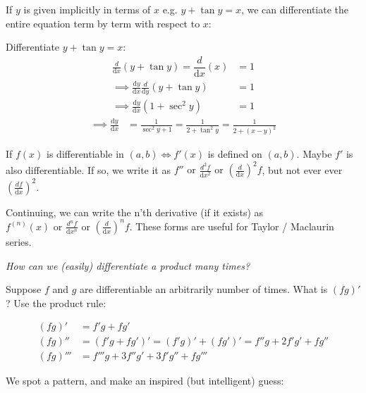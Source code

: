 \documentclass[10pt]{scrartcl}
\begin{document}

If $y$ is given implicitly in terms of $x$ e.g. $y + \tan y = x$, we can differentiate the entire equation term by term with respect to $x$:\\

\begin{example}
Differentiate $y + \tan y = x$:
\begin{align*}\nonumber
\frac{d}{\mathrm{d}x}(y + \tan y) = \dfrac{d}{\mathrm{d}x}(x) &= 1
\\ \nonumber 
\implies \frac{\mathrm{d}y}{\mathrm{d}x}\frac{d}{\mathrm{d}y}(y + \tan y) &= 1
\\ \nonumber
\implies \frac{\mathrm{d}y}{\mathrm{d}x}(1 + \sec^2y) &= 1
\end{align*}
\begin{align*}
\implies \frac{\mathrm{d}y}{\mathrm{d}x} &= \frac{1}{\sec^2y + 1} = \frac{1}{2 + \tan^2y} = \frac{1}{2 + (x-y)^2}
\end{align*}
\end{example}




If $f(x)$ is differentiable in $(a,b) \iff f'(x)$ is defined on $(a,b)$. Maybe $f'$ is also differentiable. If so, we write it as 
 $f''\text{ or }\frac{d^2f}{\mathrm{d}x^2}\text{ or }\left(\frac{d}{\mathrm{d}x}\right)^2f$, 
 but not ever ever $\left(\frac{df}{\mathrm{d}x}\right)^2$.
 
 Continuing, we can write the n'th derivative (if it exists) as 
 $f^{(n)}(x)\text{ or  }\frac{d^nf}{\mathrm{d}x^n}\text{ or }\left(\frac{d}{\mathrm{d}x}\right)^n f$. These forms are useful for Taylor / Maclaurin series.


\textit{How can we (easily) differentiate a product many times?} 

Suppose $f$ and $g$ are differentiable an arbitrarily number of times. What is $(fg)'$? Use the product rule:

\[
\begin{aligned}
  (fg)' &= f'g + fg'\\
(fg)'' &= (f'g + fg')' = (f'g)' + (fg')' = f''g + 2f'g' + fg''\\
(fg)''' &= f'''g + 3f''g' + 3f'g'' + fg'''
\end{aligned}
\]

We spot a pattern, and make an inspired (but intelligent) guess:
\end{document}
